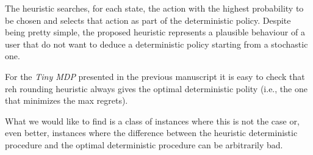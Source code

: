 \documentclass[10pt,a4paper]{article}
\begin{document}
The heuristic searches, for each state, the action with the highest probability to be chosen and selects that action as part of the deterministic policy.
Despite being pretty simple, the proposed heuristic represents a plausible behaviour of a user that do not want to deduce a deterministic policy starting from a stochastic one.  


For the \textit{Tiny MDP} presented in the previous manuscript it is easy to check that reh rounding heuristic always gives the optimal deterministic polity (i.e., the one that minimizes the max regrets).

What we would like to find is a class of instances where this is not the case or, even better, instances where the difference between the heuristic deterministic procedure and the optimal deterministic procedure can be arbitrarily bad. 	
\end{document}
